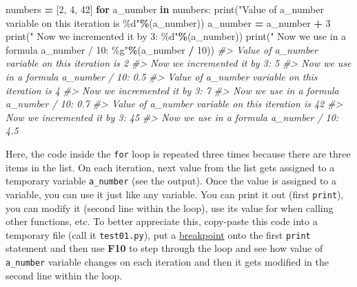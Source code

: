 \documentclass[
]{book}
\newenvironment{Shaded}{\begin{snugshade}}{\end{snugshade}}
\newcommand{\BuiltInTok}[1]{#1}
\newcommand{\CommentTok}[1]{\textcolor[rgb]{0.56,0.35,0.01}{\textit{#1}}}
\newcommand{\ControlFlowTok}[1]{\textcolor[rgb]{0.13,0.29,0.53}{\textbf{#1}}}
\newcommand{\DecValTok}[1]{\textcolor[rgb]{0.00,0.00,0.81}{#1}}
\newcommand{\KeywordTok}[1]{\textcolor[rgb]{0.13,0.29,0.53}{\textbf{#1}}}
\newcommand{\NormalTok}[1]{#1}
\newcommand{\OperatorTok}[1]{\textcolor[rgb]{0.81,0.36,0.00}{\textbf{#1}}}
\newcommand{\SpecialCharTok}[1]{\textcolor[rgb]{0.00,0.00,0.00}{#1}}
\newcommand{\StringTok}[1]{\textcolor[rgb]{0.31,0.60,0.02}{#1}}
\begin{document}
\begin{Shaded}
\begin{Highlighting}[]
\NormalTok{numbers }\OperatorTok{=}\NormalTok{ [}\DecValTok{2}\NormalTok{, }\DecValTok{4}\NormalTok{, }\DecValTok{42}\NormalTok{]}
\ControlFlowTok{for}\NormalTok{ a\_number }\KeywordTok{in}\NormalTok{ numbers:}
    \BuiltInTok{print}\NormalTok{(}\StringTok{"Value of a\_number variable on this iteration is }\SpecialCharTok{\%d}\StringTok{"}\OperatorTok{\%}\NormalTok{(a\_number))}
\NormalTok{    a\_number }\OperatorTok{=}\NormalTok{ a\_number }\OperatorTok{+} \DecValTok{3}
    \BuiltInTok{print}\NormalTok{(}\StringTok{"  Now we incremented it by 3: }\SpecialCharTok{\%d}\StringTok{"}\OperatorTok{\%}\NormalTok{(a\_number))}
    \BuiltInTok{print}\NormalTok{(}\StringTok{"  Now we use in a formula a\_number / 10: }\SpecialCharTok{\%g}\StringTok{"}\OperatorTok{\%}\NormalTok{(a\_number }\OperatorTok{/} \DecValTok{10}\NormalTok{))}
\CommentTok{\#\textgreater{} Value of a\_number variable on this iteration is 2}
\CommentTok{\#\textgreater{}   Now we incremented it by 3: 5}
\CommentTok{\#\textgreater{}   Now we use in a formula a\_number / 10: 0.5}
\CommentTok{\#\textgreater{} Value of a\_number variable on this iteration is 4}
\CommentTok{\#\textgreater{}   Now we incremented it by 3: 7}
\CommentTok{\#\textgreater{}   Now we use in a formula a\_number / 10: 0.7}
\CommentTok{\#\textgreater{} Value of a\_number variable on this iteration is 42}
\CommentTok{\#\textgreater{}   Now we incremented it by 3: 45}
\CommentTok{\#\textgreater{}   Now we use in a formula a\_number / 10: 4.5}
\end{Highlighting}
\end{Shaded}

Here, the code inside the \texttt{for} loop is repeated three times because there are three items in the list. On each iteration, next value from the list gets assigned to a temporary variable \texttt{a\_number} (see the output). Once the value is assigned to a variable, you can use it just like any variable. You can print it out (first \texttt{print}), you can modify it (second line within the loop), use its value for when calling other functions, etc. To better appreciate this, copy-paste this code into a temporary file (call it \texttt{test01.py}), put a \protect\hyperlink{debugging}{breakpoint} onto the first \texttt{print} statement and then use \textbf{F10} to step through the loop and see how value of \texttt{a\_number} variable changes on each iteration and then it gets modified in the second line within the loop.
\end{document}
